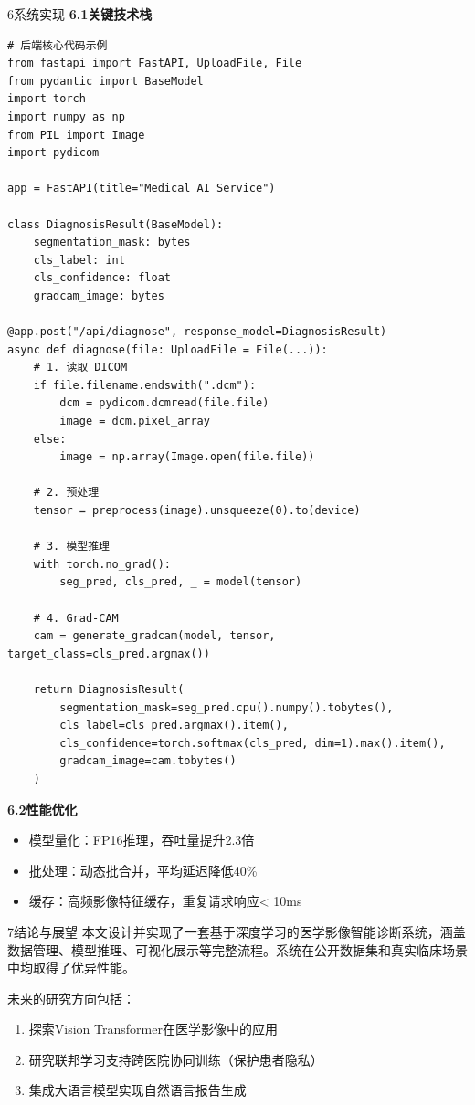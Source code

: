 \documentclass{harryopo-slides}
\begin{document}
\begin{frame}{6系统实现}
{\bfseries 6.1关键技术栈}\par\smallskip
\begin{verbatim}
# 后端核心代码示例
from fastapi import FastAPI, UploadFile, File
from pydantic import BaseModel
import torch
import numpy as np
from PIL import Image
import pydicom

app = FastAPI(title="Medical AI Service")

class DiagnosisResult(BaseModel):
    segmentation_mask: bytes
    cls_label: int
    cls_confidence: float
    gradcam_image: bytes

@app.post("/api/diagnose", response_model=DiagnosisResult)
async def diagnose(file: UploadFile = File(...)):
    # 1. 读取 DICOM
    if file.filename.endswith(".dcm"):
        dcm = pydicom.dcmread(file.file)
        image = dcm.pixel_array
    else:
        image = np.array(Image.open(file.file))

    # 2. 预处理
    tensor = preprocess(image).unsqueeze(0).to(device)

    # 3. 模型推理
    with torch.no_grad():
        seg_pred, cls_pred, _ = model(tensor)

    # 4. Grad-CAM
    cam = generate_gradcam(model, tensor, target_class=cls_pred.argmax())

    return DiagnosisResult(
        segmentation_mask=seg_pred.cpu().numpy().tobytes(),
        cls_label=cls_pred.argmax().item(),
        cls_confidence=torch.softmax(cls_pred, dim=1).max().item(),
        gradcam_image=cam.tobytes()
    )
\end{verbatim}
{\bfseries 6.2性能优化}\par\smallskip
\begin{itemize}
  \item {\fzht 模型量化}：FP16推理，吞吐量提升2.3倍
  \item {\fzht 批处理}：动态批合并，平均延迟降低40\%
  \item {\fzht 缓存}：高频影像特征缓存，重复请求响应< 10ms
\end{itemize}
\end{frame}

\begin{frame}{7结论与展望}
本文设计并实现了一套基于深度学习的医学影像智能诊断系统，涵盖数据管理、模型推理、可视化展示等完整流程。系统在公开数据集和真实临床场景中均取得了优异性能。

未来的研究方向包括：

\begin{enumerate}
  \item 探索Vision Transformer在医学影像中的应用
  \item 研究联邦学习支持跨医院协同训练（保护患者隐私）
  \item 集成大语言模型实现自然语言报告生成
\end{enumerate}
\end{frame}
\end{document}
